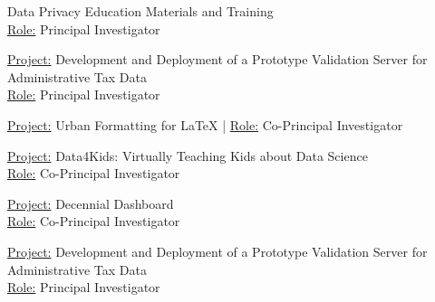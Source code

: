 \grantspace   
    {
        Data Privacy Education Materials and Training \\ 
        \underline{Role:} Principal Investigator
    }


\grantspace    
    { 
        \underline{Project:}  Development and Deployment of a Prototype Validation Server for Administrative Tax Data\\
        \underline{Role:} Principal Investigator
    }

\grantspace   
    {
        \underline{Project:} Urban Formatting for LaTeX | 
        \underline{Role:} Co-Principal Investigator
    }

\grantspace  
    {
        \underline{Project:} Data4Kids: Virtually Teaching Kids about Data Science \\ 
        \underline{Role:} Co-Principal Investigator
    }

\grantspace 
    {
        \underline{Project:} Decennial Dashboard  \\ 
        \underline{Role:} Co-Principal Investigator
    }

\grantspace 
    {
        \underline{Project:} Development and Deployment of a Prototype Validation Server for Administrative Tax Data\\
        \underline{Role:} Principal Investigator
    }

